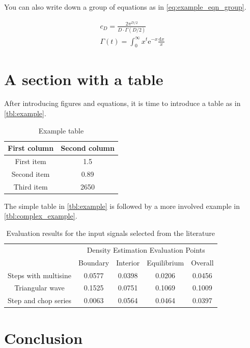 \documentclass[]{aiaa-tc}%
\begin{document}
You can also write down a group of equations as in \autoref{eq:example_eqn_group}.

\begin{eqnarray}
\label{eq:example_eqn_group}
c_{D} = \frac{2\pi^{D/2}}{D \cdot \Gamma(D/2)} \\
\Gamma(t) = \int_{0}^{\infty} x^{t} \mathrm{e}^{-x} \frac{\mathrm{d}x}{x} \nonumber
\end{eqnarray}

\section{A section with a table}

After introducing figures and equations, it is time to introduce a table as in \autoref{tbl:example}.

\begin{table}[!htb]
\caption{Example table}
\label{tbl:example}
\begin{center}
\begin{tabular}{|c|c|}
\hline
\textbf{First column} & \textbf{Second column} \\ \hline
First item & 1.5 \\ \hline
Second item & 0.89 \\ \hline
Third item & 2650 \\ \hline
\end{tabular}
\end{center}
\end{table}

The simple table in \autoref{tbl:example} is followed by a more involved example in \autoref{tbl:complex_example}.

\begin{table}[!htb]
\caption{Evaluation results for the input signals selected from the literature}
\label{tbl:complex_example}
\begin{center}
\begin{tabular}{|c|c|c|c|c|}
\cline{2-5}
\multicolumn{1}{c|}{} & \multicolumn{4}{c|}{Density Estimation Evaluation Points} \\
\cline{2-5}
\multicolumn{1}{c|}{} & Boundary & Interior & Equilibrium & Overall \\ \hline
Steps with multisine & 0.0577 & 0.0398 & 0.0206 & 0.0456 \\ \hline
Triangular wave & 0.1525 & 0.0751 & 0.1069 & 0.1009 \\ \hline
Step and chop series & 0.0063 & 0.0564 & 0.0464 & 0.0397 \\ \hline
\end{tabular}
\end{center}
\end{table}

\section{Conclusion}





\end{document}
